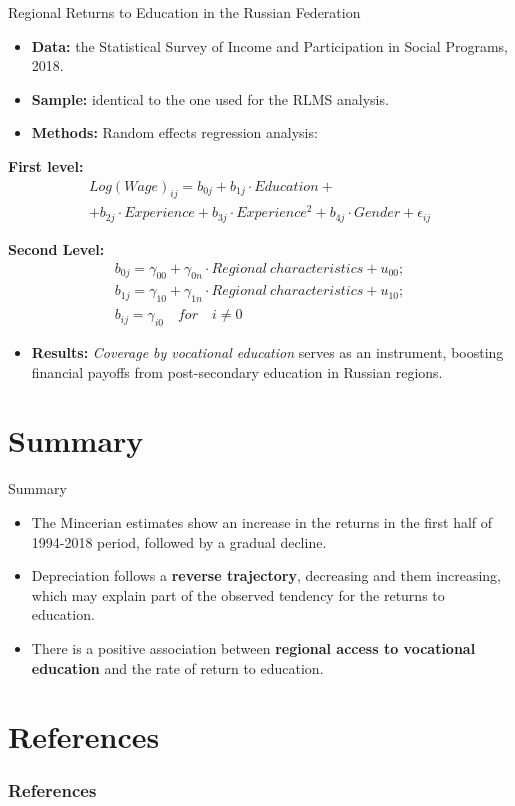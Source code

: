 \documentclass{beamer}
\begin{document}
\begin{frame}{Regional Returns to Education in the Russian Federation}
	\fontsize{10}{10}\selectfont
		\begin{itemize}
		\item \textbf{Data:} the Statistical Survey of Income and Participation in Social Programs, 2018.
		\item \textbf{Sample:} identical to the one used for the RLMS analysis.
		\item \textbf{Methods:} Random effects regression analysis:
		 \end{itemize}
	 
		\textbf{First level:}
		\begin{multline}
		Log(Wage)_{ij} = b_{0j} + b_{1j}\cdot Education + \\ + b_{2j}\cdot Experience + b_{3j}\cdot Experience^2 + b_{4j}\cdot Gender + \epsilon_{ij} 
		\end{multline}
	   
		\textbf{Second Level:}
		\begin{multline}
		b_{0j} = \gamma_{00} + \gamma_{0n}\cdot Regional \: characteristics + u_{00};\\
		b_{1j} = \gamma_{10} + \gamma_{1n}\cdot Regional \: characteristics + u_{10};\\
		b_{ij} = \gamma_{i0} \quad for \quad i \neq 0   
		\end{multline}
		\begin{itemize}	
			\item \textbf{Results:} \textit{Coverage by vocational education} serves as an instrument, boosting financial payoffs from post-secondary education in Russian regions.
		\end{itemize}
\end{frame}

\section*{Summary}
\begin{frame}{Summary}
	\fontsize{12}{17}\selectfont
	\begin{itemize}
	\item
	The Mincerian estimates show an increase in the returns in the first half of 1994-2018 period, followed by a gradual decline.
	\item
	Depreciation follows a \textbf{reverse trajectory}, decreasing and them increasing, which may explain part of the observed tendency for the returns to education.
	\item
	There is a positive association between \textbf{regional access to vocational education} and the rate of return to education.
	\end{itemize}
\end{frame}

\section*{References}
\begin{frame}
	\frametitle{References}
		\printbibliography
\end{frame}
	
\end{document}
